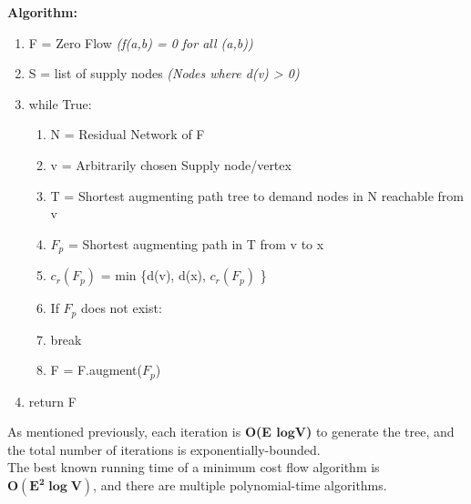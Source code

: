 \newpage
\textbf{Algorithm:}
\begin{enumerate}[label=\Alph*]
    \item F = Zero Flow \emph{(f(a,b) = 0 for all (a,b))}
    \item S = list of supply nodes \emph{(Nodes where d(v) > 0)}
    \item while True: 
\begin{enumerate}[label=\arabic*]
    \item N = Residual Network of F
    \item v = Arbitrarily chosen Supply node/vertex
    \item T = Shortest augmenting path tree to demand nodes in N reachable from v
    \item $F_p$ = Shortest augmenting path in T from v to x
    \item $c_r(F_p)$ = min \{d(v), d(x), $c_r(F_p)$ \}
    \item If $F_p$ does not exist:
    \item [] \quad break
    \item F = F.augment($F_p$)
\end{enumerate}  
\item return F
\end{enumerate}
As mentioned previously, each iteration is \textbf{O(E $\boldsymbol{log}$V)} to generate the tree, and the total number of iterations is exponentially-bounded. \\
The best known running time of a minimum cost flow algorithm is $\boldsymbol{O(E^2 \log V)}$, and there are multiple polynomial-time algorithms.